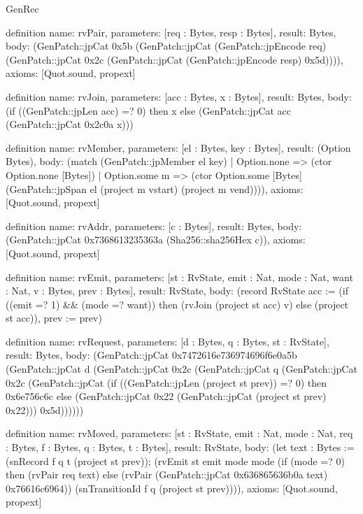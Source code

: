 \begin{lexlean}{GenRec}
\begin{semanticmodule}
definition{
  name: rvPair,
  parameters: [req : Bytes, resp : Bytes],
  result: Bytes,
  body: (GenPatch::jpCat 0x5b (GenPatch::jpCat (GenPatch::jpEncode req) (GenPatch::jpCat 0x2c (GenPatch::jpCat (GenPatch::jpEncode resp) 0x5d)))),
  axioms: [Quot.sound, propext]
}

definition{
  name: rvJoin,
  parameters: [acc : Bytes, x : Bytes],
  result: Bytes,
  body: (if ((GenPatch::jpLen acc) =? 0) then x else (GenPatch::jpCat acc (GenPatch::jpCat 0x2c0a x)))
}

definition{
  name: rvMember,
  parameters: [el : Bytes, key : Bytes],
  result: (Option Bytes),
  body: (match (GenPatch::jpMember el key)
    | Option.none => (ctor Option.none [Bytes])
    | Option.some m => (ctor Option.some [Bytes] (GenPatch::jpSpan el (project m vstart) (project m vend)))),
  axioms: [Quot.sound, propext]
}

definition{
  name: rvAddr,
  parameters: [c : Bytes],
  result: Bytes,
  body: (GenPatch::jpCat 0x7368613235363a (Sha256::sha256Hex c)),
  axioms: [Quot.sound, propext]
}

definition{
  name: rvEmit,
  parameters: [st : RvState, emit : Nat, mode : Nat, want : Nat, v : Bytes, prev : Bytes],
  result: RvState,
  body: (record RvState {acc := (if ((emit =? 1) && (mode =? want)) then (rvJoin (project st acc) v) else (project st acc)), prev := prev})
}

definition{
  name: rvRequest,
  parameters: [d : Bytes, q : Bytes, st : RvState],
  result: Bytes,
  body: (GenPatch::jpCat 0x7472616e736974696f6e0a5b (GenPatch::jpCat d (GenPatch::jpCat 0x2c (GenPatch::jpCat q (GenPatch::jpCat 0x2c (GenPatch::jpCat (if ((GenPatch::jpLen (project st prev)) =? 0) then 0x6e756c6c else (GenPatch::jpCat 0x22 (GenPatch::jpCat (project st prev) 0x22))) 0x5d))))))
}

definition{
  name: rvMoved,
  parameters: [st : RvState, emit : Nat, mode : Nat, req : Bytes, f : Bytes, q : Bytes, t : Bytes],
  result: RvState,
  body: (let text : Bytes := (snRecord f q t (project st prev)); (rvEmit st emit mode mode (if (mode =? 0) then (rvPair req text) else (rvPair (GenPatch::jpCat 0x636865636b0a text) 0x76616c6964)) (snTransitionId f q (project st prev)))),
  axioms: [Quot.sound, propext]
}


\end{semanticmodule}
\end{lexlean}
